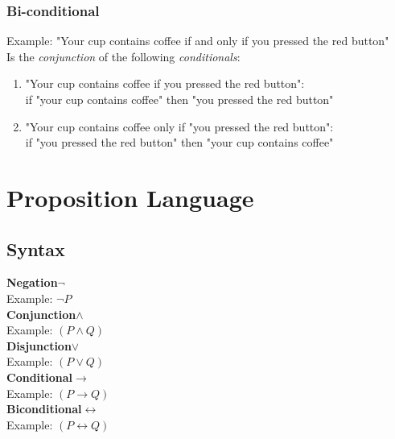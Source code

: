 \documentclass[]{article}
\begin{document}
\subsubsection{Bi-conditional}
Example: "Your cup contains coffee if and only if you pressed the red button"\\
Is the \textit{conjunction} of the following \textit{conditionals}:
\begin{enumerate}
	\item{"Your cup contains coffee if you pressed the red button":\\
if "your cup contains coffee" then "you pressed the red button"}
	\item{"Your cup contains coffee only if "you pressed the red button":\\
if "you pressed the red button" then "your cup contains coffee"}
\end{enumerate}

\section{Proposition Language}
\subsection{Syntax}
\textbf{Negation}\hspace{5pt}$\neg $\\
Example: $\neg{P}$
\vspace{5pt}\\
\textbf{Conjunction}\hspace{5pt}${\wedge}$\\
Example: $(P \wedge Q)$
\vspace{5pt}\\
\textbf{Disjunction}\hspace{5pt}${\vee}$\\
Example: $(P \vee Q)$
\vspace{5pt}\\
\textbf{Conditional}\hspace{5pt}${\rightarrow}$\\
Example: $(P \rightarrow Q)$
\vspace{5pt}\\\textbf{Biconditional}\hspace{5pt}${\leftrightarrow}$\\
Example: $(P \leftrightarrow Q)$
\end{document}
